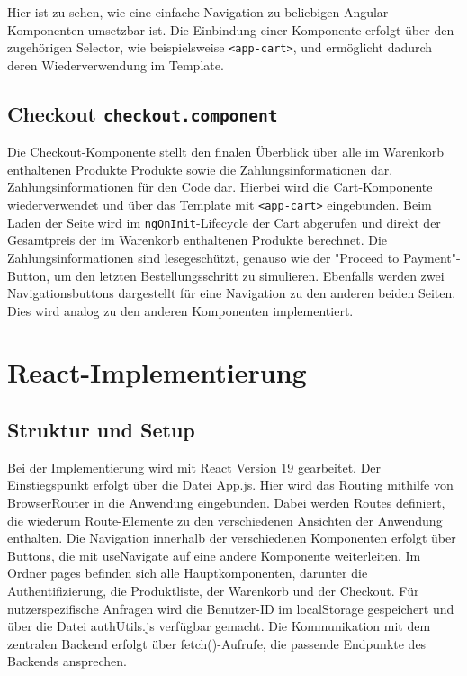 \documentclass[oneside]{ausarbeitung}
\begin{document}
Hier ist zu sehen, wie eine einfache Navigation zu beliebigen Angular-Komponenten umsetzbar ist. Die Einbindung einer Komponente erfolgt über den zugehörigen Selector, wie beispielsweise \texttt{<app-cart>}, und ermöglicht dadurch deren Wiederverwendung im Template.

\subsection{Checkout \texttt{checkout.component}}

Die Checkout-Komponente stellt den finalen Überblick über alle im Warenkorb enthaltenen Produkte Produkte sowie die Zahlungsinformationen dar. Zahlungsinformationen für den Code dar. Hierbei wird die Cart-Komponente wiederverwendet und über das Template mit \texttt{<app-cart>} eingebunden.
Beim Laden der Seite wird im \texttt{ngOnInit}-Lifecycle der Cart abgerufen und direkt der Gesamtpreis der im Warenkorb enthaltenen Produkte berechnet. Die Zahlungsinformationen sind lesegeschützt, genauso wie der "Proceed to Payment"-Button, um den letzten Bestellungsschritt zu simulieren. Ebenfalls werden zwei Navigationsbuttons dargestellt für eine Navigation zu den anderen beiden Seiten. Dies wird analog zu den anderen Komponenten implementiert.

\section{React-Implementierung}
\subsection{Struktur und Setup}

Bei der Implementierung wird mit React Version 19 gearbeitet. Der Einstiegspunkt erfolgt über die Datei App.js. Hier wird das Routing mithilfe von BrowserRouter in die Anwendung eingebunden. Dabei werden Routes definiert, die wiederum Route-Elemente zu den verschiedenen Ansichten der Anwendung enthalten. Die Navigation innerhalb der verschiedenen Komponenten erfolgt über Buttons, die mit useNavigate auf eine andere Komponente weiterleiten. Im Ordner pages befinden sich alle Hauptkomponenten, darunter die Authentifizierung, die Produktliste, der Warenkorb und der Checkout. Für nutzerspezifische Anfragen wird die Benutzer-ID im localStorage gespeichert und über die Datei authUtils.js verfügbar gemacht. Die Kommunikation mit dem zentralen Backend erfolgt über fetch()-Aufrufe, die passende Endpunkte des Backends ansprechen.
\end{document}
